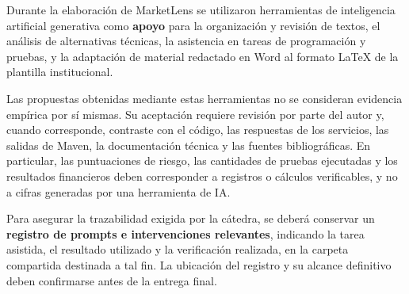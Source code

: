 Durante la elaboración de MarketLens se utilizaron herramientas de inteligencia artificial generativa como \textbf{apoyo} para la organización y revisión de textos, el análisis de alternativas técnicas, la asistencia en tareas de programación y pruebas, y la adaptación de material redactado en Word al formato LaTeX de la plantilla institucional.

Las propuestas obtenidas mediante estas herramientas no se consideran evidencia empírica por sí mismas. Su aceptación requiere revisión por parte del autor y, cuando corresponde, contraste con el código, las respuestas de los servicios, las salidas de Maven, la documentación técnica y las fuentes bibliográficas. En particular, las puntuaciones de riesgo, las cantidades de pruebas ejecutadas y los resultados financieros deben corresponder a registros o cálculos verificables, y no a cifras generadas por una herramienta de IA.

Para asegurar la trazabilidad exigida por la cátedra, se deberá conservar un \textbf{registro de prompts e intervenciones relevantes}, indicando la tarea asistida, el resultado utilizado y la verificación realizada, en la carpeta compartida destinada a tal fin. La ubicación del registro y su alcance definitivo deben confirmarse antes de la entrega final.


